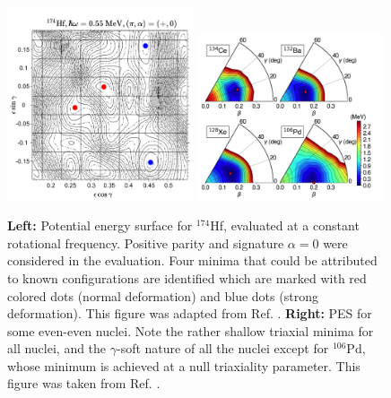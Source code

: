 \begin{figure}
    \centering
    \includegraphics[width=0.49\textwidth]{Chapters/Figures/174Hf-PES.pdf}
    \includegraphics[width=0.49\textwidth]{Chapters/Figures/even-A-PES.pdf}
    \caption{\textbf{Left:} Potential energy surface for $^{174}$Hf, evaluated at a constant rotational frequency. Positive parity and signature $\alpha=0$ were considered in the evaluation. Four minima that could be attributed to known configurations are identified which are marked with red colored dots (normal deformation) and blue dots (strong deformation). This figure was adapted from Ref. \cite{djongolov2003extending}. \textbf{Right:} PES for some even-even nuclei. Note the rather shallow triaxial minima for all nuclei, and the $\gamma$-soft nature of all the nuclei except for $^{106}$Pd, whose minimum is achieved at a null triaxiality parameter. This figure was taken from Ref. \cite{nomura2021examining}.}
    \label{pes-example-set-1}
\end{figure}
